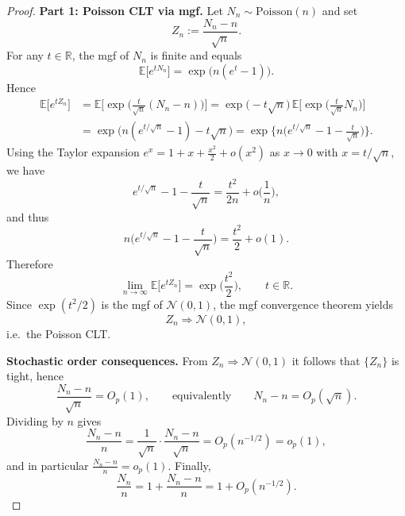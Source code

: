 \documentclass[12pt]{article}
\renewcommand{\(}{\left(}%
\renewcommand{\)}{\right)}%
\renewcommand{\[}{\left[}%
\renewcommand{\]}{\right]}%
\newtheorem{proof}{Proof.}}
\begin{document}
\begin{proof}
\textbf{Part 1: Poisson CLT via mgf.}
Let $N_n\sim \mathrm{Poisson}(n)$ and set
\begin{equation*}
Z_n:=\frac{N_n-n}{\sqrt n}.
\end{equation*}
For any $t\in\mathbb R$, the mgf of $N_n$ is finite and equals
\begin{equation*}
\mathbb E\big[e^{tN_n}\big]=\exp\big(n(e^{t}-1)\big).
\end{equation*}
Hence
\begin{equation*}
\begin{split}
	\mathbb E\big[e^{tZ_n}\big]
&=
\mathbb E\Big[\exp\Big(\frac{t}{\sqrt n}(N_n-n)\Big)\Big]=
\exp\Big(-t\sqrt n\Big)\,
\mathbb E\Big[\exp\Big(\frac{t}{\sqrt n}N_n\Big)\Big]\\
&
=
\exp\Big(n(e^{t/\sqrt n}-1)-t\sqrt n\Big)=
\exp\Big\{n\Big(e^{t/\sqrt n}-1-\frac{t}{\sqrt n}\Big)\Big\}.
\end{split}
\end{equation*}
Using the Taylor expansion $e^x=1+x+\frac{x^2}{2}+o(x^2)$ as $x\to0$ with $x=t/\sqrt n$, we have
\begin{equation*}
e^{t/\sqrt n}-1-\frac{t}{\sqrt n}
=
\frac{t^2}{2n}+o\Big(\frac{1}{n}\Big),
\end{equation*}
and thus
\begin{equation*}
n\Big(e^{t/\sqrt n}-1-\frac{t}{\sqrt n}\Big)
=
\frac{t^2}{2}+o(1).
\end{equation*}
Therefore
\begin{equation*}
\lim_{n\to\infty}\mathbb E\big[e^{tZ_n}\big]
=
\exp\Big(\frac{t^2}{2}\Big),
\qquad t\in\mathbb R.
\end{equation*}
Since $\exp(t^2/2)$ is the mgf of $\mathcal N(0,1)$, the mgf convergence theorem yields
\begin{equation*}
Z_n\Rightarrow \mathcal N(0,1),
\end{equation*}
i.e.\ the Poisson CLT.

\medskip
\textbf{Stochastic order consequences.}
From $Z_n\Rightarrow \mathcal N(0,1)$ it follows that $\{Z_n\}$ is tight, hence
\begin{equation*}
\frac{N_n-n}{\sqrt n}=O_p(1),
\qquad\text{equivalently}\qquad
N_n-n=O_p(\sqrt n).
\end{equation*}
Dividing by $n$ gives
\begin{equation*}
\frac{N_n-n}{n}
=
\frac{1}{\sqrt n}\cdot \frac{N_n-n}{\sqrt n}
=
O_p(n^{-1/2})=o_p(1),
\end{equation*}
and in particular $\frac{N_n-n}{n}=o_p(1)$. Finally,
\begin{equation*}
\frac{N_n}{n}
=
1+\frac{N_n-n}{n}
=
1+O_p(n^{-1/2}).
\end{equation*}


\end{proof}
\end{document}
